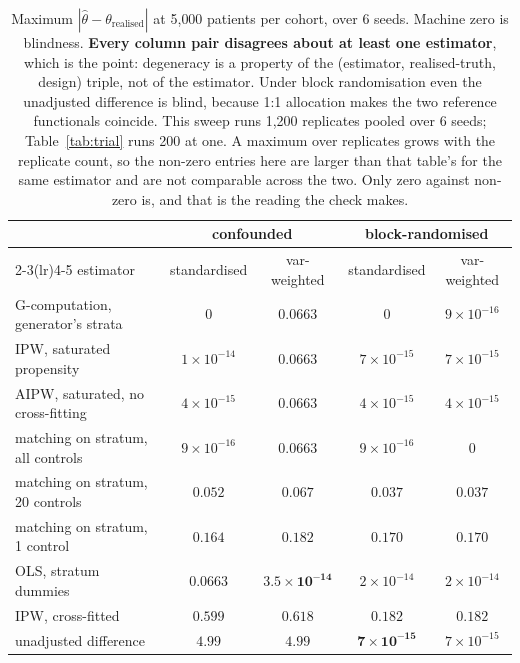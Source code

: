 \begin{table}[htbp]
\small
\centering
\caption{Maximum $|\hat\theta - \theta_{\text{realised}}|$ at 5{,}000 patients
per cohort, over 6 seeds. Machine zero is blindness. \textbf{Every column pair
disagrees about at least one estimator}, which is the point: degeneracy is a
property of the (estimator, realised-truth, design) triple, not of the
estimator. Under block randomisation even the unadjusted difference is blind,
because 1:1 allocation makes the two reference functionals coincide. This sweep runs
1{,}200 replicates pooled over 6 seeds; Table~\ref{tab:trial} runs 200 at one. A
maximum over replicates grows with the replicate count, so the non-zero entries
here are larger than that table's for the same estimator and are not comparable
across the two. Only zero against non-zero is, and that is the reading the
check makes.}
\label{tab:matrix}
\begin{tabular}{@{}lcccc@{}}
\toprule
& \multicolumn{2}{c}{\textbf{confounded}} & \multicolumn{2}{c}{\textbf{block-randomised}} \\
\cmidrule(lr){2-3}\cmidrule(lr){4-5}
estimator & standardised & var-weighted & standardised & var-weighted \\
\midrule
G-computation, generator's strata & $0$          & $0.0663$     & $0$          & $9\!\times\!10^{-16}$ \\
IPW, saturated propensity         & $1\!\times\!10^{-14}$ & $0.0663$ & $7\!\times\!10^{-15}$ & $7\!\times\!10^{-15}$ \\
AIPW, saturated, no cross-fitting & $4\!\times\!10^{-15}$ & $0.0663$ & $4\!\times\!10^{-15}$ & $4\!\times\!10^{-15}$ \\
matching on stratum, all controls & $9\!\times\!10^{-16}$ & $0.0663$ & $9\!\times\!10^{-16}$ & $0$ \\
matching on stratum, 20 controls  & $0.052$      & $0.067$      & $0.037$      & $0.037$ \\
matching on stratum, 1 control    & $0.164$      & $0.182$      & $0.170$      & $0.170$ \\
OLS, stratum dummies              & $0.0663$     & $\mathbf{3.5\!\times\!10^{-14}}$ & $2\!\times\!10^{-14}$ & $2\!\times\!10^{-14}$ \\
IPW, cross-fitted                 & $0.599$      & $0.618$      & $0.182$      & $0.182$ \\
unadjusted difference             & $4.99$       & $4.99$       & $\mathbf{7\!\times\!10^{-15}}$ & $7\!\times\!10^{-15}$ \\
\bottomrule
\end{tabular}
\end{table}

